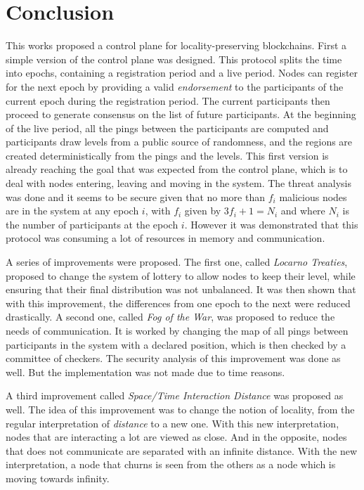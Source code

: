 \documentclass[a4paper,11pt,oneside]{report}
\begin{document}
\chapter{Conclusion} \label{chap:Conclusion}  %


This works proposed a control plane for locality-preserving blockchains. First a simple
version of the control plane was designed. This protocol splits the time into
epochs, containing a registration period and a live period. Nodes can register
for the next epoch by providing a valid \textit{endorsement} to the participants of the
current epoch during the registration period. The current participants then
proceed to generate consensus on the list of future participants. At the
beginning of the live period, all the pings between the participants are
computed and participants draw levels from a public source of randomness, and
the regions are created deterministically from the pings and the levels. This
first version is already reaching the goal that was expected from the control
plane, which is to deal with nodes entering, leaving and moving in the system.
The threat analysis was done and it seems to be secure given that no more than
$f_i$ malicious nodes are in the system at any epoch $i$, with $f_i$ given by
$3f_i+1=N_i$ and where $N_i$ is the number of participants at the epoch $i$.
However it was demonstrated that this protocol was consuming a lot of resources
in memory and communication. 

A series of improvements were proposed. The first one, called \textit{Locarno
Treaties}, proposed to change the system of lottery to allow nodes to keep
their level, while ensuring that their final distribution was not unbalanced.
It was then shown that with this improvement, the differences from one epoch to
the next were reduced drastically. A second one, called \textit{Fog of the
War}, was proposed to reduce the needs of communication. It is worked by
changing the map of all pings between participants in the system with a
declared position, which is then checked by a committee of checkers. The
security analysis of this improvement was done as well. But the implementation
was not made due to time reasons. 

A third improvement called \textit{Space/Time Interaction Distance} was proposed
as well. The idea of this improvement was to change the notion of locality,
from the regular interpretation of \textit{distance} to a new one. With this
new interpretation, nodes that are interacting a lot are viewed as close. And
in the opposite, nodes that does not communicate are separated with an infinite
distance. With the new interpretation, a node that churns is seen from the
others as a node which is moving towards infinity.  
\end{document}
